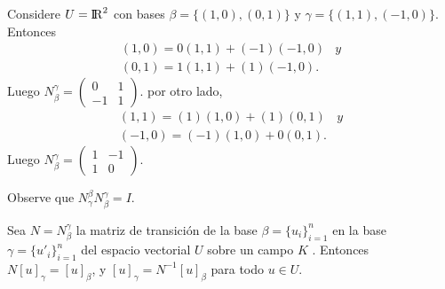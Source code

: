     			\begin{ejem} Considere $ U = {\rm I\!R}^{2} $ con bases $\beta = \{(1,0), (0,1)\}$ y $\gamma = \{(1,1), (-1,0)\}$. Entonces 
    			\[\begin{array}{cc}
						(1, 0) = 0(1, 1) + (-1)(-1, 0) & y \\
						(0, 1) = 1(1, 1) + (1)(-1, 0).
    			\end{array}\]    			
    			Luego $ N_{\beta}^{\gamma} =  \left(\begin{array}{cc}
    			0 & 1 \\ -1 & 1
    			\end{array}\right)$.  por otro lado,
    			\[\begin{array}{cc}
    			 (1, 1) = (1)(1, 0) + (1)(0, 1)& y\\ 
    			 (-1, 0) = (-1)(1, 0) + 0(0, 1). 
    			\end{array}\]
    			Luego $ N_{\beta}^{\gamma} =  \left(\begin{array}{cc}
    			1 & -1 \\ 1 & 0
    			\end{array}\right)$.
    			
    			Observe que $ N_{\gamma}^{\beta} N_{\beta}^{\gamma} = I $. 
    			\end{ejem} 
    			\begin{lem} \label{lem:lema1.1}
    				Sea $ N = N_{\beta}^{\gamma} $ la matriz de transición de la base $ \beta = \{u_{i}\}_{i=1}^{n} $ en la base $ \gamma = \{u'_{i}\}_{i=1}^{n} $ del espacio vectorial $ U $ sobre un campo $ K $ . Entonces
    				$ N[u]_{\gamma} = [u]_{\beta}$, y $ [u]_{\gamma} = N^{-1}[u]_{\beta}$ para todo $ u \in U $.
    			\end{lem}
